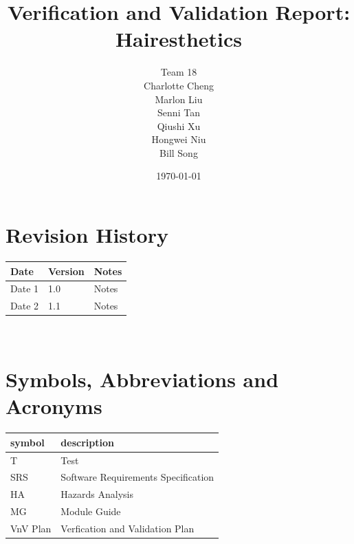 \documentclass[12pt, titlepage]{article}
\begin{document}
\title{Verification and Validation Report: Hairesthetics} 
\author{Team 18 \\ Charlotte Cheng
        \\ Marlon Liu
        \\ Senni Tan
        \\ Qiushi Xu
        \\ Hongwei Niu
        \\ Bill Song}
\date{\today}
	
\maketitle


\section{Revision History}

\begin{tabularx}{\textwidth}{p{3cm}p{2cm}X}
\toprule {\bf Date} & {\bf Version} & {\bf Notes}\\
\midrule
Date 1 & 1.0 & Notes\\
Date 2 & 1.1 & Notes\\
\bottomrule
\end{tabularx}

~\newpage

\section{Symbols, Abbreviations and Acronyms}

\renewcommand{\arraystretch}{1.2}
\begin{tabular}{l l} 
  \toprule		
  \textbf{symbol} & \textbf{description}\\
  \midrule 
  T & Test\\
  SRS & Software Requirements Specification\\
  HA & Hazards Analysis\\
  MG & Module Guide\\
  VnV Plan & Verfication and Validation Plan \\
  \bottomrule
\end{tabular}\\

\newpage

\tableofcontents

\listoftables %
\end{document}
